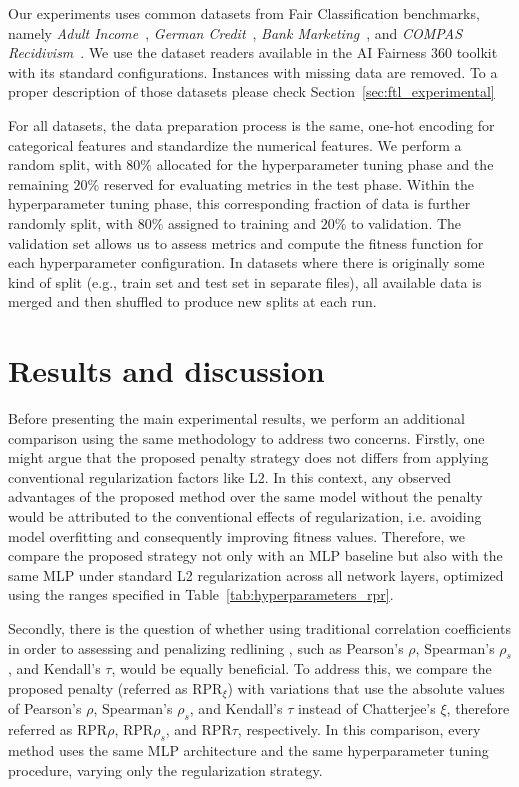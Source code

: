 Our experiments uses common datasets from Fair Classification benchmarks, namely \textit{Adult Income}~\citep{misc_adult_2}, \textit{German Credit}~\citep{misc_statlog_(german_credit_data)_144}, \textit{Bank Marketing}~\citep{misc_bank_marketing_222}, and \textit{COMPAS Recidivism}~\citep{misc_compas}. We use the dataset readers available in the AI Fairness 360 toolkit~\citep{aif360-oct-2018} with its standard configurations. Instances with missing data are removed. To a proper description of those datasets please check Section~\ref{sec:ftl_experimental}

For all datasets, the data preparation process is the same, one-hot encoding for categorical features and standardize the numerical features. We perform a random split, with $80\%$ allocated for the hyperparameter tuning phase and the remaining $20\%$ reserved for evaluating metrics in the test phase. Within the hyperparameter tuning phase, this corresponding fraction of data is further randomly split, with $80\%$ assigned to training and $20\%$ to validation. The validation set allows us to assess metrics and compute the fitness function for each hyperparameter configuration. In datasets where there is originally some kind of split (e.g., train set and test set in separate files), all available data is merged and then shuffled to produce new splits at each run.

\section{Results and discussion} \label{sec:rpr_results}

Before presenting the main experimental results, we perform an additional comparison using the same methodology to address two concerns. Firstly, one might argue that the proposed penalty strategy does not differs from applying conventional regularization factors like L2. In this context, any observed advantages of the proposed method over the same model without the penalty would be attributed to the conventional effects of regularization, i.e. avoiding model overfitting and consequently improving fitness values. Therefore, we compare the proposed strategy not only with an MLP baseline but also with the same MLP under standard L2 regularization across all network layers, optimized using the ranges specified in Table~\ref{tab:hyperparameters_rpr}.

Secondly, there is the question of whether using traditional correlation coefficients in order to assessing and penalizing redlining , such as Pearson's $\rho$, Spearman's $\rho_s$, and Kendall's $\tau$, would be equally beneficial. To address this, we compare the proposed penalty (referred as RPR$_\xi$) with variations that use the absolute values of Pearson's $\rho$, Spearman's $\rho_s$, and Kendall's $\tau$ instead of Chatterjee's $\xi$, therefore referred as RPR$\rho$, RPR${\rho_s}$, and RPR$\tau$, respectively. In this comparison, every method uses the same MLP architecture and the same hyperparameter tuning procedure, varying only the regularization strategy.

